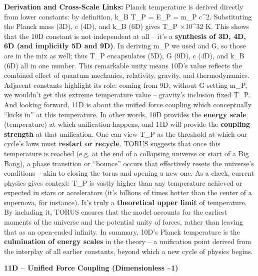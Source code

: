 \documentclass[
]{article}
\begin{document}
\textbf{Derivation and Cross-Scale Links:} Planck temperature is derived
directly from lower constants: by definition, k\_B T\_P = E\_P = m\_P
c\^{}2\hspace{0pt}. Substituting the Planck mass (3D), c (4D), and k\_B
(6D) gives T\_P ×10\^{}32 K\hspace{0pt}. This shows that the 10D
constant is not independent at all -- it's a \textbf{synthesis of 3D,
4D, 6D (and implicitly 5D and 9D)}\hspace{0pt}. In deriving m\_P we used
\hbar and G, so those are in the mix as well; thus T\_P encapsulates \hbar (5D),
G (9D), c (4D), and k\_B (6D) all in one number\hspace{0pt}. This
remarkable unity means 10D's value reflects the combined effect of
quantum mechanics, relativity, gravity, and thermodynamics. Adjacent
constants highlight its role: coming from 9D, without G setting m\_P, we
wouldn't get this extreme temperature value -- gravity's inclusion fixed
T\_P. And looking forward, 11D is about the unified force coupling which
conceptually ``kicks in'' at this temperature. In other words, 10D
provides the \textbf{energy scale} (temperature) at which unification
happens, and 11D will provide the \textbf{coupling strength} at that
unification\hspace{0pt}. One can view T\_P as the threshold at which our
cycle's laws must \textbf{restart or recycle}. TORUS suggests that once
this temperature is reached (e.g. at the end of a collapsing universe or
start of a Big Bang), a phase transition or ``bounce'' occurs that
effectively resets the universe's conditions -- akin to closing the
torus and opening a new one\hspace{0pt}. As a check, current physics
gives context: T\_P is vastly higher than any temperature achieved or
expected in stars or accelerators (it's billions of times hotter than
the center of a supernova, for instance). It's truly a
\textbf{theoretical upper limit} of temperature. By including it, TORUS
ensures that the model accounts for the earliest moments of the universe
and the potential unity of forces, rather than leaving that as an
open-ended infinity. In summary, 10D's Planck temperature is the
\textbf{culmination of energy scales} in the theory -- a unification
point derived from the interplay of all earlier constants, beyond which
a new cycle of physics begins.

\textbf{11D -- Unified Force Coupling (Dimensionless \textasciitilde1)}
\end{document}
